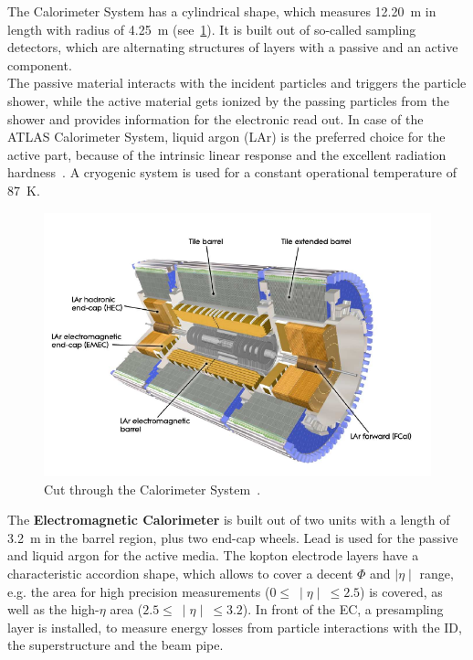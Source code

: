 \noindent The Calorimeter System has a  cylindrical shape, which measures 12.20~m in length with radius of 4.25~m (see~\cref{fig:35}). It is built out of so-called sampling detectors, which are alternating structures of layers with a passive and an active component.\\

\noindent The passive material interacts with the incident particles and triggers the particle shower, while the active material gets ionized by the passing particles from the shower and provides information for the electronic read out. In case of the ATLAS Calorimeter System, liquid argon (LAr) is the preferred choice for the active part, because of the intrinsic linear response and the excellent radiation hardness~\cite{Aad:2008zzm}. A cryogenic system is used for a constant operational temperature of 87~K.\\


\begin{figure}[h]
	\centering
	\includegraphics[width=0.65\linewidth]{Pics/cp3/35}
	\caption{Cut through the Calorimeter  System~\cite{Aad:2008zzm}.} 
	\label{fig:35}
	\end{figure}



\noindent The \textbf{Electromagnetic Calorimeter} is built out of two units with a length of 3.2~m in the barrel region, plus two end-cap wheels. Lead is used for the passive and liquid argon for the active media. The kopton electrode layers have a characteristic accordion shape, which allows to cover a decent $\Phi$  and $\mid\eta\mid$ range, e.g. the area for high precision measurements  ($0 \leq~  \mid\eta\mid ~\leq 2.5$) is covered, as well as the high-$\eta$ area  ($2.5 \leq~ \mid\eta\mid~ \leq3.2$). In front of the EC, a presampling layer is installed, to measure energy losses  from particle interactions with the ID, the superstructure and the beam pipe.\\




